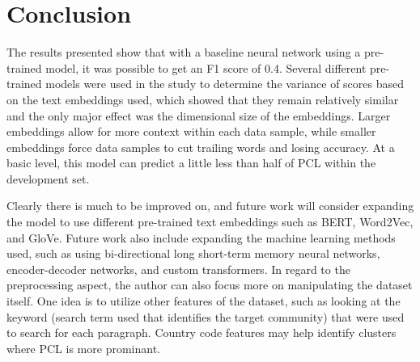 \documentclass[11pt,a4paper]{article}
\begin{document}
\section{Conclusion}
The results presented show that with a baseline neural network using a pre-trained model, it was possible to get an F1 score of 0.4. Several different pre-trained models were used in the study to determine the variance of scores based on the text embeddings used, which showed that they remain relatively similar and the only major effect was the dimensional size of the embeddings. Larger embeddings allow for more context within each data sample, while smaller embeddings force data samples to cut trailing words and losing accuracy. At a basic level, this model can predict a little less than half of PCL within the development set. 

Clearly there is much to be improved on, and future work will consider expanding the model to use different pre-trained text embeddings such as BERT, Word2Vec, and GloVe. Future work also include expanding the machine learning methods used, such as using bi-directional long short-term memory neural networks, encoder-decoder networks, and custom transformers. In regard to the preprocessing aspect, the author can also focus more on manipulating the dataset itself. One idea is to utilize other features of the dataset, such as looking at the keyword (search term used that identifies the target community) that were used to search for each paragraph. Country code features may help identify clusters where PCL is more prominant. 





\end{document}
